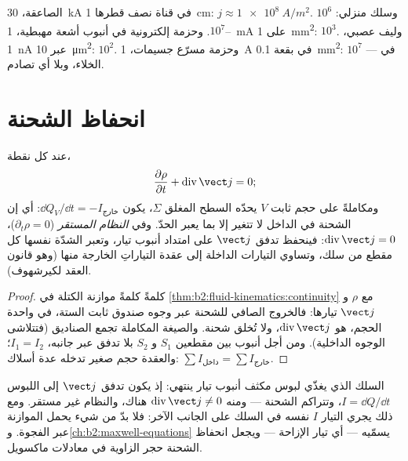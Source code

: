 \begin{example}\label{ex:b2:charges-currents-conduction:orders}
الصاعقة، \qty{30}{kA} في قناة نصف قطرها \qty{1}{cm}: $j \approx \qty{1e8}{A/m^2}$.
وسلك منزلي: $10^6$--$10^7$. وحزمة إلكترونية في أنبوب أشعة مهبطية،
\qty{1}{mA} على \qty{1}{mm^2}: $10^3$. وليف عصبي، \qty{1}{nA} عبر
\qty{10}{\micro m^2}: $10^2$. وحزمة مسرّع جسيمات، \qty{1}{A} في
بقعة \qty{0.1}{mm^2}: $10^7$ --- في الخلاء، وبلا أي تصادم.
\end{example}

\section{انحفاظ الشحنة}

\begin{theorem}\label{thm:b2:charges-currents-conduction:conservation}
عند كل نقطة،
\[
\frac{\partial\rho}{\partial t} + \operatorname{div}\vect j = 0 ;
\]
ومكاملةً على حجم ثابت $V$ يحدّه السطح المغلق $\Sigma$، يكون
$\dd Q_V/\dd t = -I_{\text{خارج}}$: أي إن الشحنة في الداخل لا تتغير إلا بما
يعبر الحدّ. وفي \emph{النظام المستقر} ($\partial_t\rho = 0$)،
$\operatorname{div}\vect j = 0$: فينحفظ تدفق $\vect j$ على امتداد أنبوب
تيار، وتعبر الشدّة نفسها كل مقطع من سلك، وتساوي
التيارات الداخلة إلى عقدة التياراتِ الخارجة منها (وهو قانون العقد لكيرشهوف).
\end{theorem}

\begin{proof}
كلمةً كلمةً موازنة الكتلة في \cref{thm:b2:fluid-kinematics:continuity}
مع $\rho$  و $\vect j$ تيارها: فالخروج الصافي
للشحنة عبر وجوه صندوق ثابت الستة، في واحدة الحجم، هو
$\operatorname{div}\vect j$، ولا تُخلق شحنة. والصيغة المكاملة تجمع
الصناديق (فتتلاشى الوجوه الداخلية). ومن أجل أنبوب بين مقطعين
$S_1$ و $S_2$ بلا تدفق عبر جانبه، $I_1 = I_2$؛ والعقدة
حجم صغير تدخله عدة أسلاك: $\sum I_{\text{داخل}} = \sum I_{\text{خارج}}$.
\end{proof}

\begin{remark}\label{rem:b2:charges-currents-conduction:capacitor}
السلك الذي يغذّي لبوس مكثف أنبوب تيار ينتهي: إذ يكون
تدفق $\vect j$ إلى اللبوس $I = \dd Q/\dd t$، وتتراكم الشحنة
--- ومنه $\operatorname{div}\vect j \ne 0$ هناك، والنظام غير مستقر.
ومع ذلك يجري التيار $I$ نفسه في السلك على الجانب الآخر: فلا بدّ من شيء
يحمل الموازنة عبر الفجوة. و\cref{ch:b2:maxwell-equations}
يسمّيه --- أي تيار الإزاحة --- ويجعل انحفاظ
الشحنة حجر الزاوية في معادلات ماكسويل.
\end{remark}

